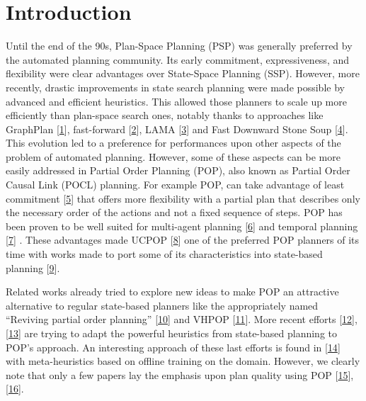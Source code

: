 \section*{Introduction}\label{introduction}

Until the end of the 90s, Plan-Space Planning (PSP) was generally
preferred by the automated planning community. Its early commitment,
expressiveness, and flexibility were clear advantages over State-Space
Planning (SSP). However, more recently, drastic improvements in state
search planning were made possible by advanced and efficient heuristics.
This allowed those planners to scale up more efficiently than plan-space
search ones, notably thanks to approaches like GraphPlan
{[}\protect\hyperlink{ref-blumux5ffastux5f1997}{1}{]}, fast-forward
{[}\protect\hyperlink{ref-hoffmannux5fffux5f2001}{2}{]}, LAMA
{[}\protect\hyperlink{ref-richterux5flamaux5f2011}{3}{]} and Fast
Downward Stone Soup
{[}\protect\hyperlink{ref-rogerux5ffastux5f2014}{4}{]}. This evolution
led to a preference for performances upon other aspects of the problem
of automated planning. However, some of these aspects can be more easily
addressed in Partial Order Planning (POP), also known as Partial Order
Causal Link (POCL) planning. For example POP, can take advantage of
least commitment
{[}\protect\hyperlink{ref-mccluskeyux5fengineeringux5f1997}{5}{]} that
offers more flexibility with a partial plan that describes only the
necessary order of the actions and not a fixed sequence of steps. POP
has been proven to be well suited for multi-agent planning
{[}\protect\hyperlink{ref-kvarnstromux5fplanningux5f2011}{6}{]} and
temporal planning
{[}\protect\hyperlink{ref-bentonux5ftemporalux5f2012}{7}{]} . These
advantages made UCPOP
{[}\protect\hyperlink{ref-penberthyux5fucpopux5f1992}{8}{]} one of the
preferred POP planners of its time with works made to port some of its
characteristics into state-based planning
{[}\protect\hyperlink{ref-gazenux5fcombiningux5f1997}{9}{]}.

Related works already tried to explore new ideas to make POP an
attractive alternative to regular state-based planners like the
appropriately named ``Reviving partial order planning''
{[}\protect\hyperlink{ref-nguyenux5frevivingux5f2001}{10}{]} and VHPOP
{[}\protect\hyperlink{ref-younesux5fvhpopux5f2003}{11}{]}. More recent
efforts
{[}\protect\hyperlink{ref-colesux5fforwardchainingux5f2010}{12}{]},
{[}\protect\hyperlink{ref-sapenaux5fcombiningux5f2014}{13}{]} are trying
to adapt the powerful heuristics from state-based planning to POP's
approach. An interesting approach of these last efforts is found in
{[}\protect\hyperlink{ref-shekharux5flearningux5f2016}{14}{]} with
meta-heuristics based on offline training on the domain. However, we
clearly note that only a few papers lay the emphasis upon plan quality
using POP {[}\protect\hyperlink{ref-ambiteux5fplanningux5f1997}{15}{]},
{[}\protect\hyperlink{ref-estlinux5flearningux5f1997}{16}{]}.

